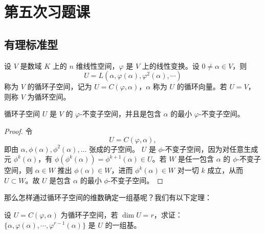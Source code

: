 \documentclass[lang=cn,12pt]{elegantbook}
\begin{document}
\chapter{第五次习题课}

\section{有理标准型}

\begin{definition}[循坏子空间]
    设 \( V \) 是数域 \( K \) 上的 \( n \) 维线性空间，\( \varphi \) 是 \( V \) 上的线性变换。设 \( 0 \neq \alpha \in V \)，则
\[
U = L(\alpha, \varphi(\alpha), \varphi^2(\alpha), \cdots)
\]
称为 \( V \) 的循环子空间，记为 \( U = C(\varphi, \alpha) \)，\( \alpha \) 称为 \( U \) 的循环向量。若 \( U = V \)，则称 \( V \) 为循环空间。
\end{definition}

\begin{theorem}
    循环子空间 \( U \) 是 \( V \) 的 \( \varphi \)-不变子空间，并且是包含 \( \alpha \) 的最小 \( \varphi \)-不变子空间。
\end{theorem}

\begin{proof}
    令
    \[
    U =  C(\varphi, \alpha),
    \]
    即由 \(\alpha, \phi(\alpha), \phi^2(\alpha), \dots\) 张成的子空间。 \(U\) 是 \(\phi\)-不变子空间，因为对任意生成元 \(\phi^k(\alpha)\)，有 \(\phi(\phi^k(\alpha)) = \phi^{k+1}(\alpha) \in U\)。若 \(W\) 是任一包含 \(\alpha\) 的 \(\phi\)-不变子空间，则 \(\alpha \in W\) 推出 \(\phi(\alpha) \in W\)，进而 \(\phi^k(\alpha) \in W\) 对一切 \(k\) 成立，从而 \(U \subset W\)。故 \(U\) 是包含 \(\alpha\) 的最小 \(\phi\)-不变子空间。
\end{proof}

那么怎样通过循环子空间的维数确定一组基呢？我们有以下定理：
\begin{theorem}
    设 \( U = C(\varphi, \alpha) \) 为循环子空间，若 \( \dim U = r \)，求证：\( \{ \alpha, \varphi(\alpha), \cdots, \varphi^{r-1}(\alpha) \} \) 是 \( U \) 的一组基。
\end{theorem}
\end{document}
